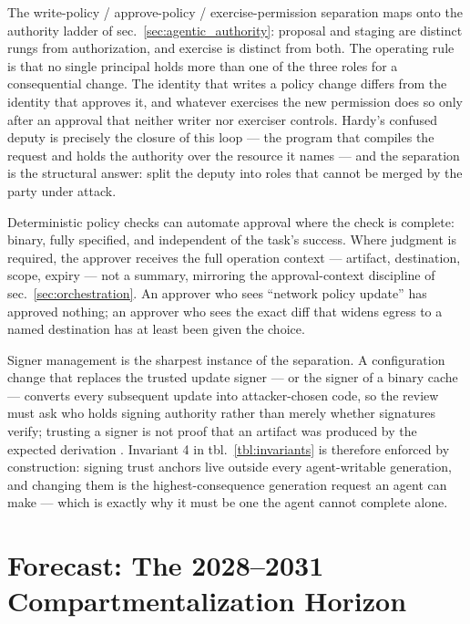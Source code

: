 \documentclass[
  english,
  9pt,
]{extarticle}
\begin{document}
The write-policy / approve-policy / exercise-permission separation maps
onto the authority ladder of sec.~\ref{sec:agentic_authority}: proposal
and staging are distinct rungs from authorization, and exercise is
distinct from both. The operating rule is that no single principal holds
more than one of the three roles for a consequential change. The
identity that writes a policy change differs from the identity that
approves it, and whatever exercises the new permission does so only
after an approval that neither writer nor exerciser controls. Hardy's
confused deputy is precisely the closure of this loop --- the program
that compiles the request and holds the authority over the resource it
names \citep{hardy1988} --- and the separation is the structural answer:
split the deputy into roles that cannot be merged by the party under
attack.

Deterministic policy checks can automate approval where the check is
complete: binary, fully specified, and independent of the task's
success. Where judgment is required, the approver receives the full
operation context --- artifact, destination, scope, expiry --- not a
summary, mirroring the approval-context discipline of
sec.~\ref{sec:orchestration}. An approver who sees ``network policy
update'' has approved nothing; an approver who sees the exact diff that
widens egress to a named destination has at least been given the choice.

Signer management is the sharpest instance of the separation. A
configuration change that replaces the trusted update signer --- or the
signer of a binary cache --- converts every subsequent update into
attacker-chosen code, so the review must ask who holds signing authority
rather than merely whether signatures verify; trusting a signer is not
proof that an artifact was produced by the expected derivation
\citep{nix_cache_signatures}. Invariant 4 in tbl.~\ref{tbl:invariants}
is therefore enforced by construction: signing trust anchors live
outside every agent-writable generation, and changing them is the
highest-consequence generation request an agent can make --- which is
exactly why it must be one the agent cannot complete alone.

\newpage

\section{Forecast: The 2028--2031 Compartmentalization
Horizon}\label{sec:forecast}
\end{document}
